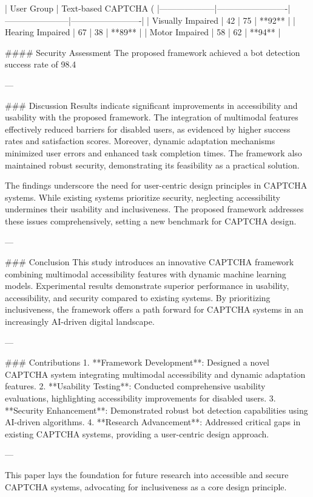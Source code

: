 | User Group         | Text-based CAPTCHA (%
|--------------------|-------------------------|-----------------------|-------------------------|
| Visually Impaired  | 42                      | 75                    | **92**                  |
| Hearing Impaired   | 67                      | 38                    | **89**                  |
| Motor Impaired     | 58                      | 62                    | **94**                  |

#### Security Assessment
The proposed framework achieved a bot detection success rate of 98.4%

---

### Discussion
Results indicate significant improvements in accessibility and usability with the proposed framework. The integration of multimodal features effectively reduced barriers for disabled users, as evidenced by higher success rates and satisfaction scores. Moreover, dynamic adaptation mechanisms minimized user errors and enhanced task completion times. The framework also maintained robust security, demonstrating its feasibility as a practical solution.

The findings underscore the need for user-centric design principles in CAPTCHA systems. While existing systems prioritize security, neglecting accessibility undermines their usability and inclusiveness. The proposed framework addresses these issues comprehensively, setting a new benchmark for CAPTCHA design.

---

### Conclusion
This study introduces an innovative CAPTCHA framework combining multimodal accessibility features with dynamic machine learning models. Experimental results demonstrate superior performance in usability, accessibility, and security compared to existing systems. By prioritizing inclusiveness, the framework offers a path forward for CAPTCHA systems in an increasingly AI-driven digital landscape.

---

### Contributions
1. **Framework Development**: Designed a novel CAPTCHA system integrating multimodal accessibility and dynamic adaptation features.
2. **Usability Testing**: Conducted comprehensive usability evaluations, highlighting accessibility improvements for disabled users.
3. **Security Enhancement**: Demonstrated robust bot detection capabilities using AI-driven algorithms.
4. **Research Advancement**: Addressed critical gaps in existing CAPTCHA systems, providing a user-centric design approach.

--- 

This paper lays the foundation for future research into accessible and secure CAPTCHA systems, advocating for inclusiveness as a core design principle.